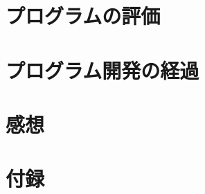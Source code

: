 \documentclass[a4j]{jarticle}
\begin{document}
\section{プログラムの評価}



\section{プログラム開発の経過}


\section{感想}


\newpage
\section*{付録}

\end{document}
